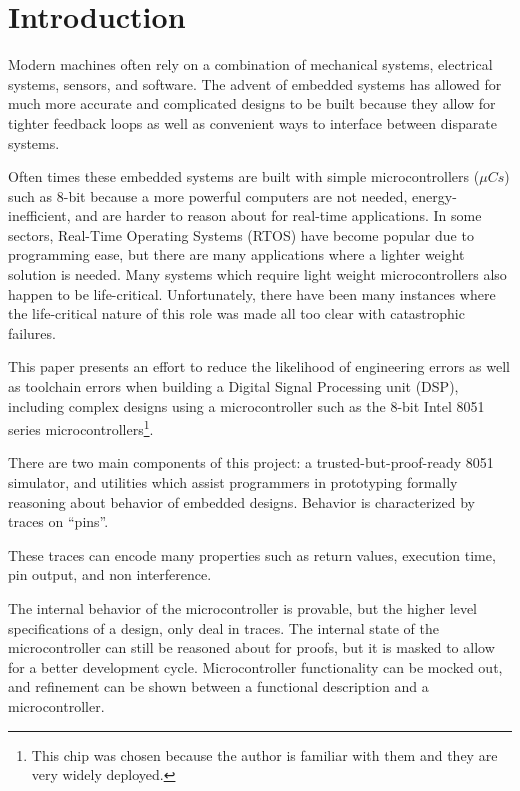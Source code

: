 \documentclass[preprint,12pt]{sigplanconf}
\begin{document}



\section{Introduction}
Modern machines often rely on a combination of mechanical systems,
electrical systems, sensors, and software. The advent of embedded
systems has allowed for much more accurate and complicated designs to
be built because they allow for tighter feedback loops as well as
convenient ways to interface between disparate systems.

Often times these embedded systems are built with simple
microcontrollers ($\mu Cs$) such as 8-bit because a more powerful
computers are not needed, energy-inefficient, and are harder to reason
about for real-time applications. In some sectors, Real-Time Operating
Systems (RTOS) have become popular due to programming ease, but there
are many applications where a lighter weight solution is needed. Many
systems which require light weight microcontrollers also happen to be
life-critical. Unfortunately, there have been many instances where the
life-critical nature of this role was made all too clear with
catastrophic failures.

This paper presents an effort to reduce the likelihood of engineering
errors as well as toolchain errors when building a Digital Signal
Processing unit (DSP), including complex designs using a
microcontroller such as the 8-bit Intel 8051 series
microcontrollers\footnote{This chip was chosen because the author is
familiar with them and they are very widely deployed.}.

There are two main components of this project: a
trusted-but-proof-ready 8051 simulator, and utilities which assist
programmers in prototyping formally reasoning about behavior of
embedded designs. Behavior is characterized by traces on ``pins''.

These traces can encode many properties such as return values,
execution time, pin output, and non interference.

The internal behavior of the microcontroller is provable, but the
higher level specifications of a design, only deal in traces. The
internal state of the microcontroller can still be reasoned about for
proofs, but it is masked to allow for a better development
cycle. Microcontroller functionality can be mocked out, and refinement
can be shown between a functional description and a microcontroller.
\end{document}
